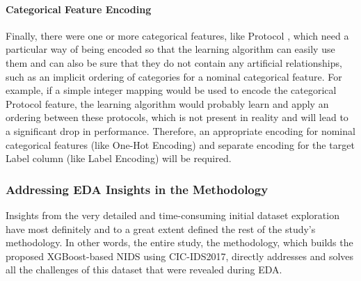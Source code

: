 \paragraph{Categorical Feature Encoding} 
Finally, there were one or more categorical features, like Protocol , which need a particular way of being encoded so that the learning algorithm can easily use them and can also be sure that they do not contain any artificial relationships, such as an implicit ordering of categories for a nominal categorical feature. For example, if a simple integer mapping would be used to encode the categorical Protocol feature, the learning algorithm would probably learn and apply an ordering between these protocols, which is not present in reality and will lead to a significant drop in performance. Therefore, an appropriate encoding for nominal categorical features (like One-Hot Encoding) and separate encoding for the target Label column (like Label Encoding) will be required.

\subsubsection{Addressing EDA Insights in the Methodology}\label{sec:bg_imbalance}
Insights from the very detailed and time-consuming initial dataset exploration have most definitely and to a great extent defined the rest of the study's methodology. In other words, the entire study, the methodology, which builds the proposed XGBoost-based NIDS using CIC-IDS2017, directly addresses and solves all the challenges of this dataset that were revealed during EDA.

